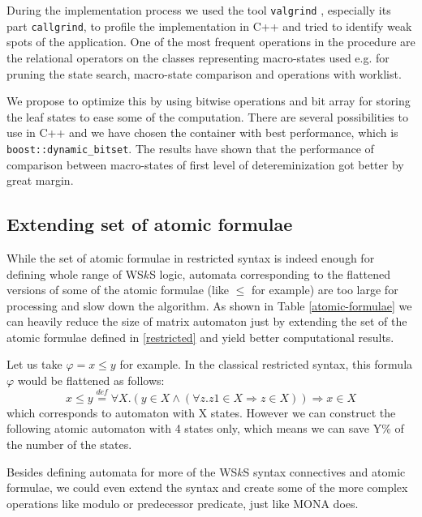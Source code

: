  During the implementation process we used the tool \texttt{valgrind}
 \cite{valgrind}, especially its part \texttt{callgrind}, to profile the
 implementation in C++ and tried to identify weak spots of the application.
 One of the most frequent operations in the procedure are the relational
 operators on the classes representing macro-states used e.g. for pruning the state search,
 macro-state comparison and operations with worklist.
 
 We propose to optimize this by using bitwise operations and bit array for
 storing the leaf states to ease some of the computation. There are several
 possibilities to use in C++ \cite{bitwise} and we have chosen the container
 with best performance, which is \texttt{boost::dynamic\_bitset}. The results
 have shown that the performance of comparison between macro-states of first
 level of detereminization got better by great margin.
 
 \subsection{Extending set of atomic formulae}
 
 While the set of atomic formulae in restricted syntax is indeed enough for
 defining whole range of WS$k$S logic, automata corresponding to the flattened
 versions of some of the atomic formulae (like $\leq$ for example) are too large
 for processing and slow down the algorithm. As shown in Table
 \ref{atomic-formulae} we can heavily reduce the size of matrix automaton just
 by extending the set of the atomic formulae defined in \ref{restricted} and yield
 better computational results.
 
 \noindent\hrulefill
 \begin{example}
 Let us take $\varphi = x \leq y$ for example. In the classical restricted
 syntax, this formula $\varphi$ would be flattened as follows:
 \begin{equation}
  x \leq y \overset{\mathit{def}}{=} \forall X. (y \in X \wedge (\forall z. z1
  \in X \Rightarrow z \in X)) \Rightarrow x \in X
 \end{equation} 
 which corresponds to automaton with X states. However we can construct the
 following atomic automaton with 4 states only, which means we can save Y\% of
 the number of the states.
 \end{example}
 
 \noindent\hrulefill
 
 Besides defining automata for more of the WS$k$S syntax connectives and atomic
 formulae, we could even extend the syntax and create some of the more complex
 operations like modulo or predecessor predicate, just like \textsc{MONA} does.
 
